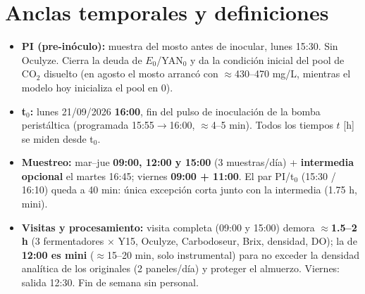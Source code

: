 \documentclass[10pt,landscape]{article}
\begin{document}
\section{Anclas temporales y definiciones}
\begin{itemize}\setlength{\itemsep}{1pt}
\item \textbf{PI (pre-inóculo):} muestra del mosto antes de inocular, lunes 15:30. Sin Oculyze. Cierra la deuda de $E_0$/YAN$_0$ y da la condición inicial del pool de CO$_2$ disuelto (en agosto el mosto arrancó con $\approx$430--470 mg/L, mientras el modelo hoy inicializa el pool en 0).
\item \textbf{t$_0$:} lunes 21/09/2026 \textbf{16:00}, fin del pulso de inoculación de la bomba peristáltica (programada 15:55$\rightarrow$16:00, $\approx$4--5 min). Todos los tiempos $t$ [h] se miden desde t$_0$.
\item \textbf{Muestreo:} mar--jue \textbf{09:00, 12:00 y 15:00} (3 muestras/día) + \textbf{intermedia opcional} el martes 16:45; viernes \textbf{09:00 + 11:00}. El par PI/t$_0$ (15:30 / 16:10) queda a 40 min: única excepción corta junto con la intermedia (1.75 h, mini).
\item \textbf{Visitas y procesamiento:} visita completa (09:00 y 15:00) demora \textbf{$\approx$1.5--2 h} (3 fermentadores $\times$ Y15, Oculyze, Carbodoseur, Brix, densidad, DO); la de \textbf{12:00 es mini} ($\approx$15--20 min, solo instrumental) para no exceder la densidad analítica de los originales (2 paneles/día) y proteger el almuerzo. Viernes: salida 12:30. Fin de semana sin personal.
\end{itemize}

\end{document}
